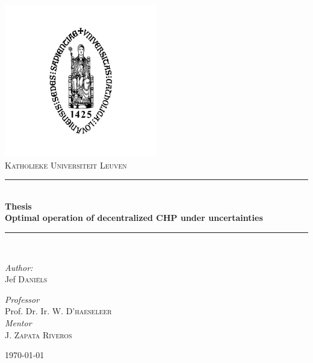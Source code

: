 \documentclass[pdftex12pt, a4paper]{book}
\newcommand{\HRule}{\rule{\linewidth}{0.5mm}}
\begin{document}
\setlength\parindent{0pt}

\begin{titlepage}
\begin{center}

\includegraphics[width=0.5\textwidth]{Images/Sedes}\\[0.1cm]    

\textsc{\LARGE Katholieke Universiteit Leuven}\\[1.5cm]

\HRule \\[0.4cm]
{ \huge \bfseries Thesis \\ \vspace{2mm}Optimal operation of decentralized CHP under uncertainties }\\[0.4cm]

\HRule \\[1.5cm]

\begin{minipage}{0.4\textwidth}
\begin{flushleft} \large
\emph{Author:}\\
Jef \textsc{Dani\"els}\\
\vspace{40mm}
\end{flushleft}
\end{minipage}
\begin{minipage}{0.4\textwidth}
\begin{flushright} \large
\emph{Professor} \\
Prof. Dr. Ir. W. \textsc{D'haeseleer}\\
\emph{Mentor} \\
J. \textsc{Zapata Riveros }\\
\vspace{30mm}
\end{flushright}
\end{minipage}

\vfill

{\large \today}

\end{center}

\end{titlepage}
\end{document}
